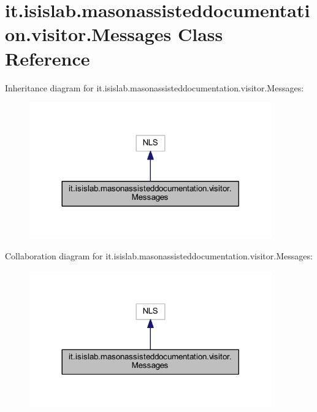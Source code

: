 \hypertarget{classit_1_1isislab_1_1masonassisteddocumentation_1_1visitor_1_1_messages}{\section{it.\-isislab.\-masonassisteddocumentation.\-visitor.\-Messages Class Reference}
\label{classit_1_1isislab_1_1masonassisteddocumentation_1_1visitor_1_1_messages}
}


Inheritance diagram for it.\-isislab.\-masonassisteddocumentation.\-visitor.\-Messages\-:
\nopagebreak
\begin{figure}[H]
\begin{center}
\leavevmode
\includegraphics[width=296pt]{classit_1_1isislab_1_1masonassisteddocumentation_1_1visitor_1_1_messages__inherit__graph}
\end{center}
\end{figure}


Collaboration diagram for it.\-isislab.\-masonassisteddocumentation.\-visitor.\-Messages\-:
\nopagebreak
\begin{figure}[H]
\begin{center}
\leavevmode
\includegraphics[width=296pt]{classit_1_1isislab_1_1masonassisteddocumentation_1_1visitor_1_1_messages__coll__graph}
\end{center}
\end{figure}
